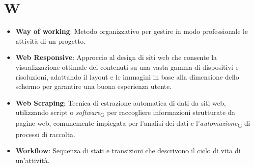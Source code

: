 \section{W}
\begin{itemize}
    \item \textbf{Way of working}: Metodo organizzativo per gestire in modo professionale le attività di un progetto.
    \item \textbf{Web Responsive}: Approccio al design di siti web che consente la visualizzazione ottimale dei contenuti su una vasta gamma di dispositivi e risoluzioni, adattando il layout e le immagini in base alla dimensione dello schermo per garantire una buona esperienza utente.
    \item \textbf{Web Scraping}: Tecnica di estrazione automatica di dati da siti web, utilizzando script o \textit{software}\textsubscript{G} per raccogliere informazioni strutturate da pagine web, comunemente impiegata per l'analisi dei dati e l'\textit{automazione}\textsubscript{G} di processi di raccolta.
    \item \textbf{Workflow}: Sequenza di stati e transizioni che descrivono il ciclo di vita di un’attività.
\end{itemize}

